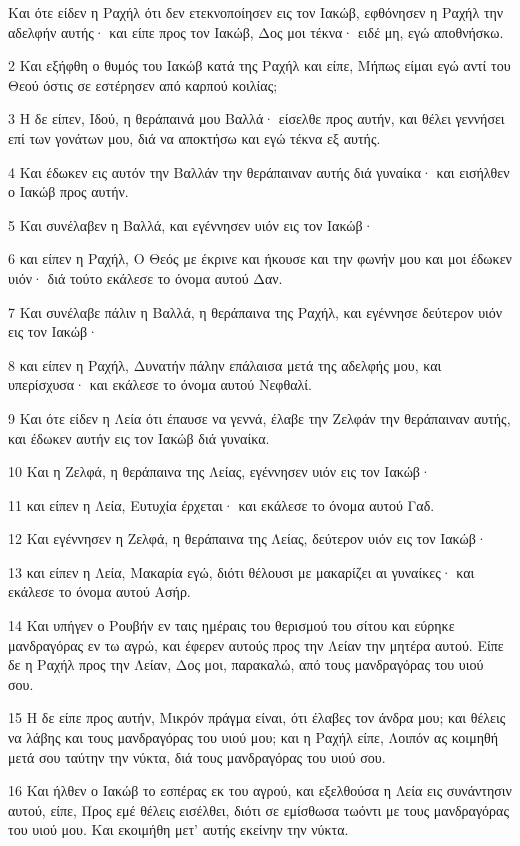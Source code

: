\par Και ότε είδεν η Ραχήλ ότι δεν ετεκνοποίησεν εις τον Ιακώβ, εφθόνησεν η Ραχήλ την αδελφήν αυτής· και είπε προς τον Ιακώβ, Δος μοι τέκνα· ειδέ μη, εγώ αποθνήσκω.
\par 2 Και εξήφθη ο θυμός του Ιακώβ κατά της Ραχήλ και είπε, Μήπως είμαι εγώ αντί του Θεού όστις σε εστέρησεν από καρπού κοιλίας;
\par 3 Η δε είπεν, Ιδού, η θεράπαινά μου Βαλλά· είσελθε προς αυτήν, και θέλει γεννήσει επί των γονάτων μου, διά να αποκτήσω και εγώ τέκνα εξ αυτής.
\par 4 Και έδωκεν εις αυτόν την Βαλλάν την θεράπαιναν αυτής διά γυναίκα· και εισήλθεν ο Ιακώβ προς αυτήν.
\par 5 Και συνέλαβεν η Βαλλά, και εγέννησεν υιόν εις τον Ιακώβ·
\par 6 και είπεν η Ραχήλ, Ο Θεός με έκρινε και ήκουσε και την φωνήν μου και μοι έδωκεν υιόν· διά τούτο εκάλεσε το όνομα αυτού Δαν.
\par 7 Και συνέλαβε πάλιν η Βαλλά, η θεράπαινα της Ραχήλ, και εγέννησε δεύτερον υιόν εις τον Ιακώβ·
\par 8 και είπεν η Ραχήλ, Δυνατήν πάλην επάλαισα μετά της αδελφής μου, και υπερίσχυσα· και εκάλεσε το όνομα αυτού Νεφθαλί.
\par 9 Και ότε είδεν η Λεία ότι έπαυσε να γεννά, έλαβε την Ζελφάν την θεράπαιναν αυτής, και έδωκεν αυτήν εις τον Ιακώβ διά γυναίκα.
\par 10 Και η Ζελφά, η θεράπαινα της Λείας, εγέννησεν υιόν εις τον Ιακώβ·
\par 11 και είπεν η Λεία, Ευτυχία έρχεται· και εκάλεσε το όνομα αυτού Γαδ.
\par 12 Και εγέννησεν η Ζελφά, η θεράπαινα της Λείας, δεύτερον υιόν εις τον Ιακώβ·
\par 13 και είπεν η Λεία, Μακαρία εγώ, διότι θέλουσι με μακαρίζει αι γυναίκες· και εκάλεσε το όνομα αυτού Ασήρ.
\par 14 Και υπήγεν ο Ρουβήν εν ταις ημέραις του θερισμού του σίτου και εύρηκε μανδραγόρας εν τω αγρώ, και έφερεν αυτούς προς την Λείαν την μητέρα αυτού. Είπε δε η Ραχήλ προς την Λείαν, Δος μοι, παρακαλώ, από τους μανδραγόρας του υιού σου.
\par 15 Η δε είπε προς αυτήν, Μικρόν πράγμα είναι, ότι έλαβες τον άνδρα μου; και θέλεις να λάβης και τους μανδραγόρας του υιού μου; και η Ραχήλ είπε, Λοιπόν ας κοιμηθή μετά σου ταύτην την νύκτα, διά τους μανδραγόρας του υιού σου.
\par 16 Και ήλθεν ο Ιακώβ το εσπέρας εκ του αγρού, και εξελθούσα η Λεία εις συνάντησιν αυτού, είπε, Προς εμέ θέλεις εισέλθει, διότι σε εμίσθωσα τωόντι με τους μανδραγόρας του υιού μου. Και εκοιμήθη μετ' αυτής εκείνην την νύκτα.
